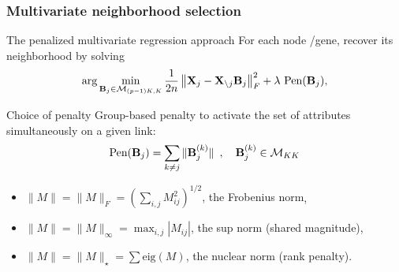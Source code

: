 \begin{frame}
  \frametitle{Multivariate neighborhood selection} 

  \begin{block}{The penalized multivariate regression approach}
    For each node /gene, recover its neighborhood by solving 
    \begin{equation*}
      \arg  \min_{\mathbf{B}_j  \in  \mathcal{M}_{(p-1)K,K}}  \frac{1}{2n} \left\|
        \mathbf{X}_j - \mathbf{X}_{\backslash j}\mathbf{B}_j\right\|_F^2 +
      \lambda \ \text{Pen}(\mathbf{B}_j),
    \end{equation*}
  \end{block}
  
  \vfill
  
  \begin{block}{Choice of penalty}
    Group-based   penalty   to   activate  the   set   of   attributes
    simultaneously on a given link:
    \begin{equation*}
      \text{Pen}(\mathbf{B}_j) =       \sum_{k \neq j}  \|\mathbf{B}_j^{(k)}\|  \enskip  ,
      \quad \mathbf{B}_j^{(k)} \in \mathcal{M}_{KK}
    \end{equation*}
    \begin{itemize}
    \item  \alert{$\|M\|=   \|M\|_F=\left(  \sum_{i,j}  M_{ij}^2\right)^{1/2}$,
        the Frobenius norm},
    \item  $\|M\|=  \|M\|_\infty=  \max_{i,j}{|M_{ij}|}$, the  sup  norm
      (shared magnitude),
    \item $\|M\|= \|M\|_\star=\sum \mathrm{eig}(M)$, the nuclear norm
      (rank penalty).
    \end{itemize}      
  \end{block}
\end{frame}

